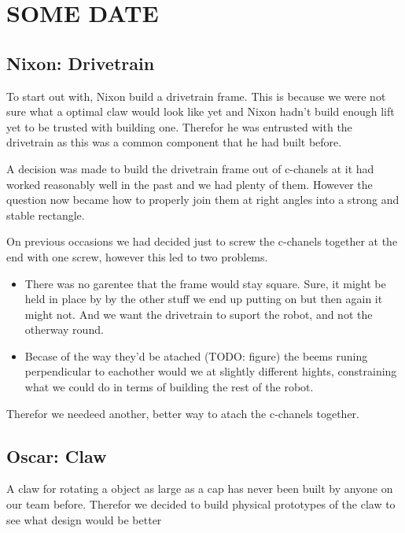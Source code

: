 \documentclass[../../../main.tex]{subfiles}
\begin{document}
\section{SOME DATE}

\subsection{Nixon: Drivetrain}

To start out with, Nixon build a drivetrain frame.
This is because we were not sure what a optimal claw would look like yet and Nixon hadn't build enough lift yet to be trusted with building one.
Therefor he was entrusted with the drivetrain as this was a common component that he had built before.
\par

A decision was made to build the drivetrain frame out of c-chanels at it had worked reasonably well in the past and we had plenty of them.
However the question now became how to properly join them at right angles into a strong and stable rectangle.
\par

On previous occasions we had decided just to screw the c-chanels together at the end with one screw, however this led to two problems.
\par

\begin{itemize}
	\item There was no garentee that the frame would stay square.
	      Sure, it might be held in place by by the other stuff we end up putting on but then again it might not.
	      And we want the drivetrain to suport the robot, and not the otherway round.
	\item Becase of the way they'd be atached (TODO: figure) the beems
	      runing perpendicular to eachother would we at slightly different
	      hights,
	      constraining what we could do in terms of building the rest of
	      the robot.
\end{itemize}

Therefor we needeed another, better way to atach the c-chanels together.

\subsection{Oscar: Claw}

A claw for rotating a object as large as a cap has never been built by anyone on our team before.
Therefor we decided to build physical prototypes of the claw to see what design would be better \par
\end{document}
